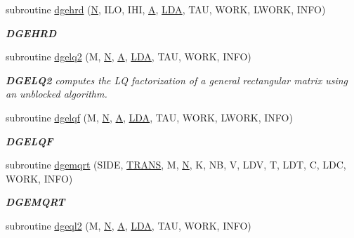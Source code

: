 \begin{DoxyCompactItemize}
subroutine \hyperlink{group__doubleGEcomputational_ga2611cc9dfdc84e2a08ec57a5dd6cdd2e}{dgehrd} (\hyperlink{polmisc_8c_a0240ac851181b84ac374872dc5434ee4}{N}, I\+L\+O, I\+H\+I, \hyperlink{classA}{A}, \hyperlink{example__user_8c_ae946da542ce0db94dced19b2ecefd1aa}{L\+D\+A}, T\+A\+U, W\+O\+R\+K, L\+W\+O\+R\+K, I\+N\+F\+O)
\begin{DoxyCompactList}\small\item\em {\bfseries D\+G\+E\+H\+R\+D} \end{DoxyCompactList}\item 
subroutine \hyperlink{group__doubleGEcomputational_ga2f10ebf79772a5399be9ed6169c9d975}{dgelq2} (M, \hyperlink{polmisc_8c_a0240ac851181b84ac374872dc5434ee4}{N}, \hyperlink{classA}{A}, \hyperlink{example__user_8c_ae946da542ce0db94dced19b2ecefd1aa}{L\+D\+A}, T\+A\+U, W\+O\+R\+K, I\+N\+F\+O)
\begin{DoxyCompactList}\small\item\em {\bfseries D\+G\+E\+L\+Q2} computes the L\+Q factorization of a general rectangular matrix using an unblocked algorithm. \end{DoxyCompactList}\item 
subroutine \hyperlink{group__doubleGEcomputational_ga436228e38ef5c55e3229502afa2c4220}{dgelqf} (M, \hyperlink{polmisc_8c_a0240ac851181b84ac374872dc5434ee4}{N}, \hyperlink{classA}{A}, \hyperlink{example__user_8c_ae946da542ce0db94dced19b2ecefd1aa}{L\+D\+A}, T\+A\+U, W\+O\+R\+K, L\+W\+O\+R\+K, I\+N\+F\+O)
\begin{DoxyCompactList}\small\item\em {\bfseries D\+G\+E\+L\+Q\+F} \end{DoxyCompactList}\item 
subroutine \hyperlink{group__doubleGEcomputational_gaf55d7b3137b198647461d429a7e9b2c6}{dgemqrt} (S\+I\+D\+E, \hyperlink{superlu__enum__consts_8h_a0c4e17b2d5cea33f9991ccc6a6678d62a1f61e3015bfe0f0c2c3fda4c5a0cdf58}{T\+R\+A\+N\+S}, M, \hyperlink{polmisc_8c_a0240ac851181b84ac374872dc5434ee4}{N}, K, N\+B, V, L\+D\+V, T, L\+D\+T, C, L\+D\+C, W\+O\+R\+K, I\+N\+F\+O)
\begin{DoxyCompactList}\small\item\em {\bfseries D\+G\+E\+M\+Q\+R\+T} \end{DoxyCompactList}\item 
subroutine \hyperlink{group__doubleGEcomputational_gaa3c49765445900907515a341da534d19}{dgeql2} (M, \hyperlink{polmisc_8c_a0240ac851181b84ac374872dc5434ee4}{N}, \hyperlink{classA}{A}, \hyperlink{example__user_8c_ae946da542ce0db94dced19b2ecefd1aa}{L\+D\+A}, T\+A\+U, W\+O\+R\+K, I\+N\+F\+O)

\end{DoxyCompactItemize}
